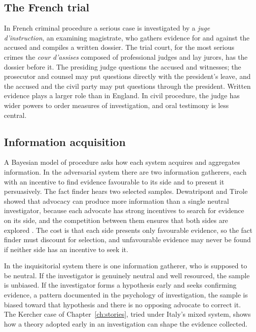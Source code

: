 \subsection{The French trial}

In French criminal procedure a serious case is investigated by a \emph{juge d'instruction}, an examining magistrate, who gathers evidence for and against the accused and compiles a written dossier. The trial court, for the most serious crimes the \emph{cour d'assises} composed of professional judges and lay jurors, has the dossier before it. The presiding judge questions the accused and witnesses; the prosecutor and counsel may put questions directly with the president's leave, and the accused and the civil party may put questions through the president. Written evidence plays a larger role than in England. In civil procedure, the judge has wider powers to order measures of investigation, and oral testimony is less central.

\subsection{Information acquisition}

A Bayesian model of procedure asks how each system acquires and aggregates information. In the adversarial system there are two information gatherers, each with an incentive to find evidence favourable to its side and to present it persuasively. The fact finder hears two selected samples. Dewatripont and Tirole showed that advocacy can produce more information than a single neutral investigator, because each advocate has strong incentives to search for evidence on its side, and the competition between them ensures that both sides are explored \citep{dewatripont1999}. The cost is that each side presents only favourable evidence, so the fact finder must discount for selection, and unfavourable evidence may never be found if neither side has an incentive to seek it.

In the inquisitorial system there is one information gatherer, who is supposed to be neutral. If the investigator is genuinely neutral and well resourced, the sample is unbiased. If the investigator forms a hypothesis early and seeks confirming evidence, a pattern documented in the psychology of investigation, the sample is biased toward that hypothesis and there is no opposing advocate to correct it. The Kercher case of Chapter~\ref{ch:stories}, tried under Italy's mixed system, shows how a theory adopted early in an investigation can shape the evidence collected.


